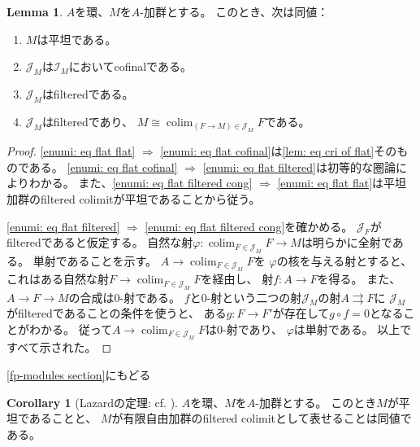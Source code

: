 \documentclass[uplatex]{jsarticle}
\theoremstyle{definition}
\newtheorem{cor}[cor]{Corollary}
\newtheorem{lem}[lem]{Lemma}
\theoremstyle{plain}
\DeclareMathOperator{\colim}{\mathrm{colim}}
\newcommand{\mcI}{\mathcal{I}}
\newcommand{\mcJ}{\mathcal{J}}
\begin{document}
\begin{lem}\label{lem: Lazerd lem}
  \(A\)を環、\(M\)を\(A\)-加群とする。
  このとき、次は同値：
  \begin{enumerate}
    \item \label{enumi: eq flat flat}
    \(M\)は平坦である。
    \item \label{enumi: eq flat cofinal}
    \(\mcJ_M\)は\(\mcI_M\)においてcofinalである。
    \item \label{enumi: eq flat filtered}
    \(\mcJ_M\)はfilteredである。
    \item \label{enumi: eq flat filtered cong}
    \(\mcJ_M\)はfilteredであり、
    \(M\cong \colim _{(F\to M)\in \mcJ_M}F\)である。
  \end{enumerate}
\end{lem}

\begin{proof}
  \ref{enumi: eq flat flat} \(\Rightarrow\)
  \ref{enumi: eq flat cofinal}は\autoref{lem: eq cri of flat}そのものである。
  \ref{enumi: eq flat cofinal} \(\Rightarrow\)
  \ref{enumi: eq flat filtered}は初等的な圏論によりわかる。
  また、\ref{enumi: eq flat filtered cong} \(\Rightarrow\)
  \ref{enumi: eq flat flat}は平坦加群のfiltered colimitが平坦であることから従う。

  \ref{enumi: eq flat filtered} \(\Rightarrow\)
  \ref{enumi: eq flat filtered cong}を確かめる。
  \(\mcJ_F\)がfilteredであると仮定する。
  自然な射\(\varphi:\colim_{F\in \mcJ_M}F\to M\)は明らかに全射である。
  単射であることを示す。
  \(A\to \colim_{F\in\mcJ_M}F\)を
  \(\varphi\)の核を与える射とすると、
  これはある自然な射\(F\to \colim_{F\in\mcJ_M}F\)を経由し、
  射\(f:A\to F\)を得る。
  また、\(A\to F\to M\)の合成は\(0\)-射である。
  \(f\)と\(0\)-射という二つの射\(\mcJ_M\)の射\(A\rightrightarrows F\)に
  \(\mcJ_M\)がfilteredであることの条件を使うと、
  ある\(g:F\to F'\)が存在して\(g\circ f=0\)となることがわかる。
  従って\(A\to \colim_{F\in\mcJ_M}F\)は\(0\)-射であり、
  \(\varphi\)は単射である。
  以上ですべて示された。
\end{proof}


\autoref{fp-modules section}にもどる

\begin{cor}[{Lazardの定理: cf. \cite[\href{https://stacks.math.columbia.edu/tag/058G}{Tag 058G}]{stacks-project}}]
  \(A\)を環、\(M\)を\(A\)-加群とする。
  このとき\(M\)が平坦であることと、
  \(M\)が有限自由加群のfiltered colimitとして表せることは同値である。
\end{cor}
\end{document}
